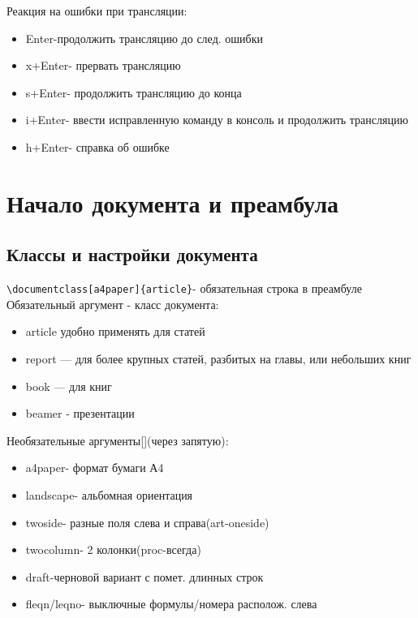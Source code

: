 \documentclass[a4paper,12pt]{article}%
\theoremstyle{plain}%
\theoremstyle{definition}%
\theoremstyle{remark}%
\begin{document}
Реакция на ошибки при трансляции:
\begin{itemize}
\item Enter-продолжить трансляцию до след. ошибки
\item x+Enter- прервать трансляцию
\item s+Enter- продолжить трансляцию до конца
\item i+Enter- ввести исправленную команду в консоль и продолжить трансляцию
\item h+Enter- справка об ошибке
\end{itemize}



\section{Начало документа и преамбула}
\subsection{Классы и настройки документа}

\verb|\documentclass[a4paper]{article}|- обязательная строка в преамбуле\\
Обязательный аргумент{} - класс документа:
\begin{itemize}
\item article удобно применять для статей
\item report — для более крупных статей, разбитых на главы, или небольших книг
\item book — для книг
\item beamer - презентации
\end{itemize}

\noindent Необязательные аргументы[](через запятую):
\begin{itemize}
\item a4paper- формат бумаги А4
\item landscape- альбомная ориентация
\item twoside- разные поля слева и справа(art-oneside)
\item twocolumn- 2 колонки(proc-всегда)
\item draft-черновой вариант с помет. длинных строк
\item fleqn/leqno- выключные формулы/номера располож. слева
\end{itemize}
\end{document}
